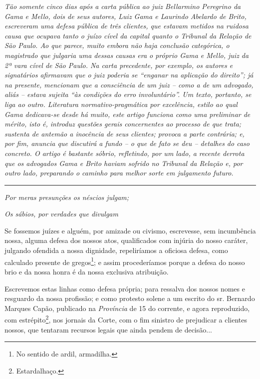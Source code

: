 \emph{Tão somente cinco dias após a carta pública ao juiz Bellarmino
Peregrino da Gama e Mello, dois de seus autores, Luiz Gama e Laurindo
Abelardo de Brito, escreveram uma defesa pública de três clientes, que
estavam metidos na ruidosa causa que ocupava tanto o juízo cível da
capital quanto o Tribunal da Relação de São Paulo. Ao que parece, muito
embora não haja conclusão categórica, o magistrado que julgaria uma
dessas causas era o próprio Gama e Mello, juiz da 2ª vara cível de São
Paulo. Na carta precedente, por exemplo, os autores e signatários
afirmavam que o juiz poderia se ``enganar na aplicação do direito''; já
na presente, mencionam que a consciência de um juiz -- como a de um
advogado, aliás -- estava sujeita ``às condições do erro involuntário''.
Um texto, portanto, se liga ao outro. Literatura normativo-pragmática
por excelência, estilo ao qual Gama dedicava-se desde há muito, este
artigo funciona como uma preliminar de mérito, isto é, introduz questões
gerais concernentes ao processo de que trata; sustenta de antemão a
inocência de seus clientes; provoca a parte contrária; e, por fim,
anuncia que discutirá a fundo -- o que de fato se deu -- detalhes do
caso concreto. O artigo é bastante sóbrio, refletindo, por um lado, a
recente derrota que os advogados Gama e Brito haviam sofrido no Tribunal
da Relação e, por outro lado, preparando o caminho para melhor sorte em
julgamento futuro.}

\begin{center}\rule{0.5\linewidth}{\linethickness}\end{center}

\emph{Por meras presunções os néscios julgam;}

\emph{Os sábios, por verdades que divulgam}

Se fossemos juízes e alguém, por amizade ou civismo, escrevesse, sem
incumbência nossa, alguma defesa dos nossos atos, qualificados com
injúria do nosso caráter, julgando ofendida a nossa dignidade,
repeliríamos a oficiosa defesa, como calculado presente de
gregos\footnote{No sentido de ardil, armadilha.}; e assim procederíamos
porque a defesa do nosso brio e da nossa honra é da nossa exclusiva
atribuição.

Escrevemos estas linhas como defesa própria; para ressalva dos nossos
nomes e resguardo da nossa profissão; e como protesto solene a um
escrito do sr. Bernardo Marques Capão, publicado na \emph{Província} de
15 do corrente, e agora reproduzido, com estrépito\footnote{Estardalhaço.},
nos jornais da Corte, com o fim sinistro de prejudicar a clientes
nossos, que tentaram recursos legais que ainda pendem de decisão...

